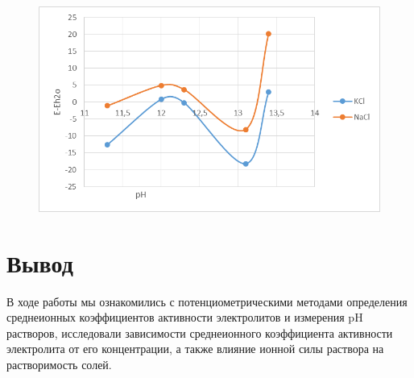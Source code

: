 \documentclass[a4paper, 12pt]{article}
\begin{document}
\begin{figure}[h!]
	\centering
	\caption{}
\includegraphics[width=1\textwidth]{image017.png}
\end{figure}

\newpage
\section{Вывод}
В ходе работы мы ознакомились с потенциометрическими методами определения среднеионных коэффициентов активности электролитов и измерения pH растворов, исследовали зависимости среднеионного коэффициента активности электролита от его концентрации, а также влияние ионной силы раствора на растворимость солей.
\end{document}

